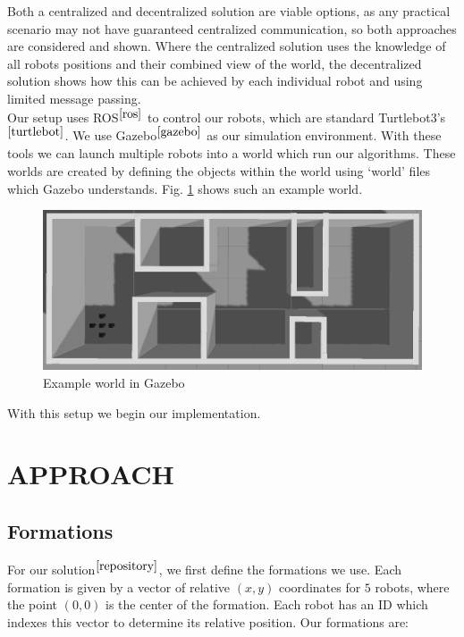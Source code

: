 \documentclass[letterpaper, 10 pt, conference]{ieeeconf}  %
\begin{document}
Both a centralized and decentralized solution are viable options, as any practical scenario may not have guaranteed centralized communication, so both approaches are considered and shown. Where the centralized solution uses the knowledge of all robots positions and their combined view of the world, the decentralized solution shows how this can be achieved by each individual robot and using limited message passing. \\

Our setup uses ROS$^{\cite{ros}}$ to control our robots, which are standard Turtlebot3's$^{\cite{turtlebot}}$. We use Gazebo$^{\cite{gazebo}}$ as our simulation environment. With these tools we can launch multiple robots into a world which run our algorithms. These worlds are created by defining the objects within the world using `world' files which Gazebo understands. Fig. \ref{corridorworld} shows such an example world.

\begin{figure}[thpb]
\centering
\includegraphics[width=\linewidth]{corridorworld}
\caption{Example world in Gazebo}
\label{corridorworld}
\end{figure}

With this setup we begin our implementation.

\section{APPROACH}

\subsection{Formations}
\label{formationsubsection}

For our solution$^{\cite{repository}}$, we first define the formations we use. Each formation is given by a vector of relative $(x,y)$ coordinates for $5$ robots, where the point $(0,0)$ is the center of the formation. Each robot has an ID which indexes this vector to determine its relative position. Our formations are: \\
\end{document}
